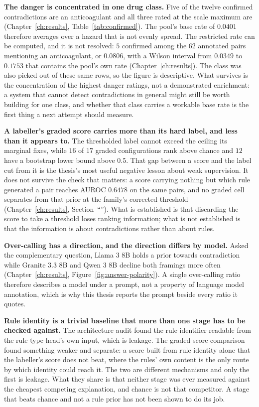 \textbf{The danger is concentrated in one drug class.} Five of the twelve confirmed contradictions
are an anticoagulant and all three rated at the scale maximum are
(Chapter~\ref{ch:results}, Table~\ref{tab:confirmed}). The pool's base rate of $0.0401$ therefore
averages over a hazard that is not evenly spread. The restricted rate can be computed, and it is
not resolved: $5$ confirmed among the $62$ annotated pairs mentioning an anticoagulant, or
$0.0806$, with a Wilson interval from $0.0349$ to $0.1753$ that contains the pool's own rate
(Chapter~\ref{ch:results}). The class was also picked out of these same rows, so the figure is
descriptive. What survives is the concentration of the highest danger ratings, not a demonstrated
enrichment: a system that cannot detect contradictions in general might still be worth building for
one class, and whether that class carries a workable base rate is the first thing a next attempt
should measure.

\textbf{A labeller's graded score carries more than its hard label, and less than it appears to.}
The thresholded label cannot exceed the ceiling its marginal fixes, while $16$ of $17$ graded
configurations rank above chance and $12$ have a bootstrap lower bound above $0.5$. That gap
between a score and the label cut from it is the thesis's most useful negative lesson about weak
supervision. It does not survive the check that matters: a score carrying nothing but which rule
generated a pair reaches AUROC $0.6478$ on the same pairs, and no graded cell separates from that
prior at the family's corrected threshold (Chapter~\ref{ch:results},
Section~``''). What is established is that discarding the score to take a
threshold loses ranking information; what is not established is that the information is about
contradictions rather than about rules.

\textbf{Over-calling has a direction, and the direction differs by model.} Asked the complementary
question, Llama 3 8B holds a prior towards contradiction while Granite 3.3 8B and Qwen 3 8B
decline both framings more often (Chapter~\ref{ch:results}, Figure~\ref{fig:answer-polarity}).
A single over-calling ratio therefore describes a model under a prompt, not a property of language
model annotation, which is why this thesis reports the prompt beside every ratio it quotes.

\textbf{Rule identity is a trivial baseline that more than one stage has to be checked against.}
The architecture audit found the rule identifier readable from the rule-type head's own input, which
is leakage. The graded-score comparison found something weaker and separate: a score built from
rule identity alone that the labeller's score does not beat, where the rules' own content is the
only route by which identity could reach it. The two are different mechanisms and only the first is
leakage. What they share is that neither stage was ever measured against the cheapest competing
explanation, and chance is not that competitor. A stage that beats chance and not a rule prior has
not been shown to do its job.

